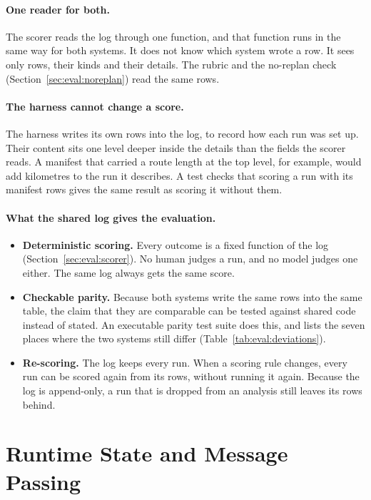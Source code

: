 \paragraph{One reader for both.} The scorer reads the log through one
function, and that function runs in the same way for both systems. It does not
know which system wrote a row. It sees only rows, their kinds and their
details. The rubric and the no-replan check (Section~\ref{sec:eval:noreplan})
read the same rows.

\paragraph{The harness cannot change a score.} The harness writes its own rows
into the log, to record how each run was set up. Their content sits one level
deeper inside the details than the fields the scorer reads. A manifest that
carried a route length at the top level, for example, would add kilometres to
the run it describes. A test checks that scoring a run with its manifest rows
gives the same result as scoring it without them.

\paragraph{What the shared log gives the evaluation.}
\begin{itemize}
  \item \textbf{Deterministic scoring.} Every outcome is a fixed function of
  the log (Section~\ref{sec:eval:scorer}). No human judges a run, and no model
  judges one either. The same log always gets the same score.
  \item \textbf{Checkable parity.} Because both systems write the same rows
  into the same table, the claim that they are comparable can be tested
  against shared code instead of stated. An executable parity test suite
  does this, and lists the seven places where the two systems still differ
  (Table~\ref{tab:eval:deviations}).
  \item \textbf{Re-scoring.} The log keeps every run. When a scoring rule
  changes, every run can be scored again from its rows, without running it
  again. Because the log is append-only, a run that is dropped from an
  analysis still leaves its rows behind.
\end{itemize}

\section{Runtime State and Message Passing}
\label{sec:data:runtime}

